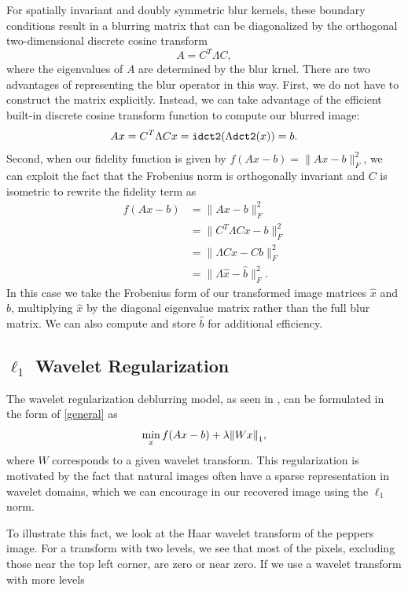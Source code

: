 \documentclass[10pt,a4paper]{article}
\begin{document}
For spatially invariant and doubly symmetric blur kernels, these boundary conditions result in a blurring matrix that can be diagonalized by the orthogonal two-dimensional discrete cosine transform
\begin{equation}
A = C^T \Lambda C,
\end{equation}
where the eigenvalues of $A$ are determined by the blur krnel. There are two advantages of representing the blur operator in this way. First, we do not have to construct the matrix explicitly. Instead, we can take advantage of the efficient built-in discrete cosine transform function to compute our blurred image:
\begin{equation}
Ax = C^T \Lambda C x = {\tt idct2}( \Lambda {\tt dct2}(x)) = b.
\end{equation}
Second, when our fidelity function is given by $f(Ax -b) = \| Ax - b \|_F^2$, we can exploit the fact that the Frobenius norm is orthogonally invariant and $C$ is isometric to rewrite the fidelity term as
\begin{align*}
f(Ax - b) &= \| Ax - b \|_F^2 \\
&= \| C^T \Lambda C x - b \|_F^2 \\
&= \| \Lambda Cx - Cb \|_F^2 \\
&= \| \Lambda \hat{x} - \hat{b} \|_F^2.
\end{align*}
In this case we take the Frobenius form of our transformed image matrices $\hat x$ and $\hat b$, multiplying $\hat x$ by the diagonal eigenvalue matrix rather than the full blur matrix. We can also compute and store $\hat b$ for additional efficiency. 

\subsection{$\ell_1$ Wavelet Regularization}

The wavelet regularization deblurring model, as seen in \cite{FISTA}, can be formulated in the form of \eqref{general} as 
\begin{equation} \label{wavelet_orig}
\min_{x} f(Ax-b) + \lambda \norm{Wx}_1 ,
\end{equation}
where $W$ corresponds to a given wavelet transform. This regularization is motivated by the fact that natural images often have a sparse representation in wavelet domains, which we can encourage in our recovered image using the $\ell_1$ norm. 

To illustrate this fact, we look at the Haar wavelet transform of the peppers image. For a transform with two levels, we see that most of the pixels, excluding those near the top left corner, are zero or near zero. If we use a wavelet transform with more levels
\end{document}
